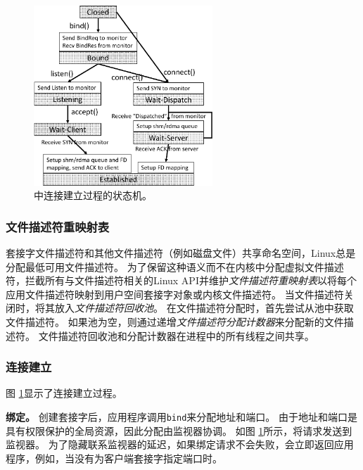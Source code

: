 \begin{figure}[htbp]
	\centering
	\includegraphics[width=0.6\textwidth]{images/conn-setup-new}
	\caption{\libipc{} 中连接建立过程的状态机。}
	\label{socksdirect:fig:conn-setup}
\end{figure}


\subsubsection{文件描述符重映射表}
\label{socksdirect:subsubsec:fd-remapping-table}



套接字文件描述符和其他文件描述符（例如磁盘文件）共享命名空间，Linux总是分配最低可用文件描述符。
为了保留这种语义而不在内核中分配虚拟文件描述符，\libipc {}拦截所有与文件描述符相关的Linux API并维护\emph {文件描述符重映射表}以将每个应用文件描述符映射到用户空间套接字对象或内核文件描述符。
当文件描述符关闭时，\libipc {}将其放入\emph {文件描述符回收池}。
在文件描述符分配时，\libipc {}首先尝试从池中获取文件描述符。
如果池为空，则通过递增\emph {文件描述符分配计数器}来分配新的文件描述符。
文件描述符回收池和分配计数器在进程中的所有线程之间共享。

\subsubsection{连接建立}


图 \ref {socksdirect:fig:conn-setup}显示了连接建立过程。

\textbf{绑定。}
创建套接字后，应用程序调用\texttt {bind}来分配地址和端口。
由于地址和端口是具有权限保护的全局资源，因此分配由监视器协调。
如图 \ref {socksdirect:fig:conn-setup}所示，\libipc {}将请求发送到监视器。
为了隐藏联系监视器的延迟，如果绑定请求不会失败，\libipc {}会立即返回应用程序，例如，当没有为客户端套接字指定端口时。

